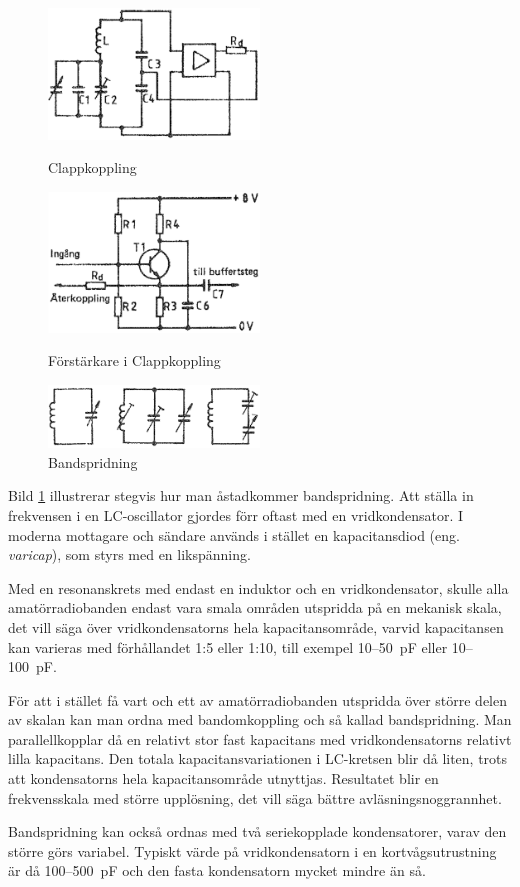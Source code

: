 \begin{figure}
  \includegraphics[width=0.5\textwidth]{images/cropped_pdfs/bild_2_3-73a.pdf}
  \caption{Clappkoppling}
  \label{fig:BildII3-73a}

  \includegraphics[width=0.5\textwidth]{images/cropped_pdfs/bild_2_3-73b.pdf}
  \caption{Förstärkare i Clappkoppling}
  \label{fig:BildII3-73b}

  \includegraphics[width=0.5\textwidth]{images/cropped_pdfs/bild_2_3-74.pdf}
  \caption{Bandspridning}
  \label{fig:BildII3-74}
\end{figure}

Bild \ref{fig:BildII3-74} illustrerar stegvis hur man åstadkommer
bandspridning.
Att ställa in frekvensen i en LC-oscillator gjordes förr oftast med en
vridkondensator.
I moderna mottagare och sändare används i stället en kapacitansdiod (eng. \emph{varicap}), som
styrs med en likspänning.

Med en resonanskrets med endast en induktor och en vridkondensator, skulle
alla amatörradiobanden endast vara smala områden utspridda på en mekanisk
skala, det vill säga över vridkondensatorns hela kapacitansområde, varvid
kapacitansen kan varieras med förhållandet 1:5 eller 1:10, till exempel
10--50~pF eller 10--100~pF.

För att i stället få vart och ett av amatörradiobanden utspridda över större
delen av skalan kan man ordna med bandomkoppling och så kallad bandspridning.
Man parallellkopplar då en relativt stor fast kapacitans med vridkondensatorns
relativt lilla kapacitans.
Den totala kapacitansvariationen i LC-kretsen blir då liten, trots att
kondensatorns hela kapacitansområde utnyttjas.
Resultatet blir en frekvensskala med större upplösning, det vill säga bättre
avläsningsnoggrannhet.

Bandspridning kan också ordnas med två seriekopplade kondensatorer,
varav den större görs variabel.
Typiskt värde på vridkondensatorn i en kortvågsutrustning är då 100--500~pF
och den fasta kondensatorn mycket mindre än så.
